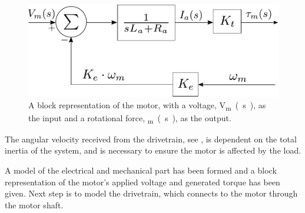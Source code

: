 \begin{figure}[H]
	\centering
	\includegraphics[scale=0.9]{figures/motormodelBlock.pdf}
	\caption{A block representation of the motor, with a voltage, \si{V_m(s)}, as the input and a rotational force, \si{\tau_m(s)}, as the output.}
	\label{fig:motormodelBlock}
\end{figure}

The angular velocity received from the drivetrain, see , is dependent on the total inertia of the system, and is necessary to ensure the motor is affected by the load.

A model of the electrical and mechanical part has been formed and a block representation of the motor's applied voltage and generated torque has been given. Next step is to model the drivetrain, which connects to the motor through the motor shaft.
